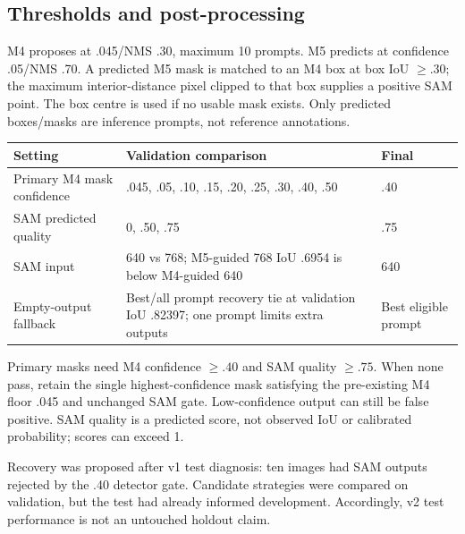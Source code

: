 \documentclass[11pt,a4paper]{article}
\begin{document}
\subsection{Thresholds and post-processing}
M4 proposes at .045/NMS .30, maximum 10 prompts. M5 predicts at confidence .05/NMS .70. A predicted M5 mask is matched to an M4 box at box IoU $\geq .30$; the maximum interior-distance pixel clipped to that box supplies a positive SAM point. The box centre is used if no usable mask exists. Only predicted boxes/masks are inference prompts, not reference annotations.
\par\noindent\begin{tabularx}{\linewidth}{@{}l Y l@{}}\toprule
Setting & Validation comparison & Final\\\midrule
Primary M4 mask confidence & .045, .05, .10, .15, .20, .25, .30, .40, .50 & .40\\
SAM predicted quality & 0, .50, .75 & .75\\
SAM input & 640 vs 768; M5-guided 768 IoU .6954 is below M4-guided 640 & 640\\
Empty-output fallback & Best/all prompt recovery tie at validation IoU .82397; one prompt limits extra outputs & Best eligible prompt\\\bottomrule
\end{tabularx}\par
Primary masks need M4 confidence $\geq .40$ and SAM quality $\geq .75$. When none pass, retain the single highest-confidence mask satisfying the pre-existing M4 floor .045 and unchanged SAM gate. Low-confidence output can still be false positive. SAM quality is a predicted score, not observed IoU or calibrated probability; scores can exceed 1.

Recovery was proposed after v1 test diagnosis: ten images had SAM outputs rejected by the .40 detector gate. Candidate strategies were compared on validation, but the test had already informed development. Accordingly, v2 test performance is not an untouched holdout claim.
\end{document}
